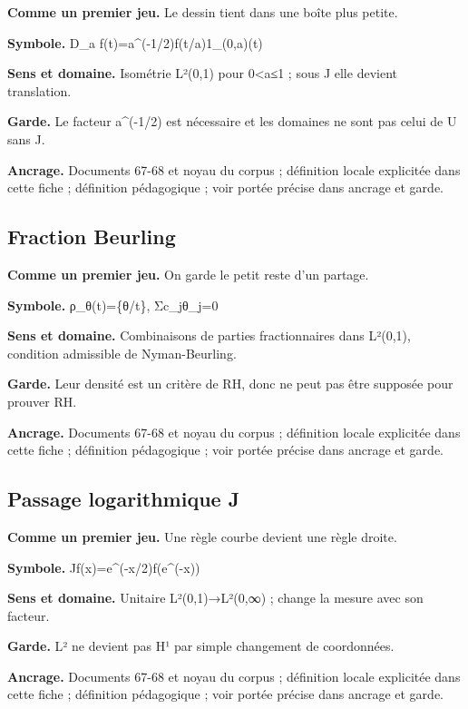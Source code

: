 \documentclass[
  9pt,
  a4paper,
]{article}
\begin{document}
\textbf{Comme un premier jeu.} Le dessin tient dans une boîte plus
petite.

\textbf{Symbole.} D\_a f(t)=a\^{}(-1/2)f(t/a)1\_(0,a)(t)

\textbf{Sens et domaine.} Isométrie L²(0,1) pour 0\textless a≤1 ; sous J
elle devient translation.

\textbf{Garde.} Le facteur a\^{}(-1/2) est nécessaire et les domaines ne
sont pas celui de U sans J.

\textbf{Ancrage.} Documents 67-68 et noyau du corpus ; définition locale
explicitée dans cette fiche ; définition pédagogique ; voir portée
précise dans ancrage et garde.

\hypertarget{fraction-beurling}{%
\subsection{Fraction Beurling}\label{fraction-beurling}}

\textbf{Comme un premier jeu.} On garde le petit reste d'un partage.

\textbf{Symbole.} ρ\_θ(t)=\{θ/t\}, Σc\_jθ\_j=0

\textbf{Sens et domaine.} Combinaisons de parties fractionnaires dans
L²(0,1), condition admissible de Nyman-Beurling.

\textbf{Garde.} Leur densité est un critère de RH, donc ne peut pas être
supposée pour prouver RH.

\textbf{Ancrage.} Documents 67-68 et noyau du corpus ; définition locale
explicitée dans cette fiche ; définition pédagogique ; voir portée
précise dans ancrage et garde.

\hypertarget{passage-logarithmique-j}{%
\subsection{Passage logarithmique J}\label{passage-logarithmique-j}}

\textbf{Comme un premier jeu.} Une règle courbe devient une règle
droite.

\textbf{Symbole.} Jf(x)=e\^{}(-x/2)f(e\^{}(-x))

\textbf{Sens et domaine.} Unitaire L²(0,1)→L²(0,∞) ; change la mesure
avec son facteur.

\textbf{Garde.} L² ne devient pas H¹ par simple changement de
coordonnées.

\textbf{Ancrage.} Documents 67-68 et noyau du corpus ; définition locale
explicitée dans cette fiche ; définition pédagogique ; voir portée
précise dans ancrage et garde.
\end{document}
